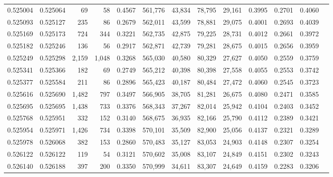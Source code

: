 \begin{tabular}{rrrrrrrrrrrrr}
0.525004 & 0.525064 &    69 &    58 &                                     0.4567 & 561,776 &  43,834 &  78,795 &  29,161 & 0.3995 & 0.2701 & 0.4060 \\
0.525093 & 0.525127 &   235 &    86 &                                     0.2679 & 562,011 &  43,599 &  78,881 &  29,075 & 0.4001 & 0.2693 & 0.4039 \\
0.525169 & 0.525173 &   724 &   344 &                                     0.3221 & 562,735 &  42,875 &  79,225 &  28,731 & 0.4012 & 0.2661 & 0.3972 \\
0.525182 & 0.525246 &   136 &    56 &                                     0.2917 & 562,871 &  42,739 &  79,281 &  28,675 & 0.4015 & 0.2656 & 0.3959 \\
0.525249 & 0.525298 & 2,159 & 1,048 &                                     0.3268 & 565,030 &  40,580 &  80,329 &  27,627 & 0.4050 & 0.2559 & 0.3759 \\
0.525341 & 0.525366 &   182 &    69 &                                     0.2749 & 565,212 &  40,398 &  80,398 &  27,558 & 0.4055 & 0.2553 & 0.3742 \\
0.525377 & 0.525584 &   211 &    86 &                                     0.2896 & 565,423 &  40,187 &  80,484 &  27,472 & 0.4060 & 0.2545 & 0.3723 \\
0.525616 & 0.525690 & 1,482 &   797 &                                     0.3497 & 566,905 &  38,705 &  81,281 &  26,675 & 0.4080 & 0.2471 & 0.3585 \\
0.525695 & 0.525695 & 1,438 &   733 &                                     0.3376 & 568,343 &  37,267 &  82,014 &  25,942 & 0.4104 & 0.2403 & 0.3452 \\
0.525768 & 0.525951 &   332 &   152 &                                     0.3140 & 568,675 &  36,935 &  82,166 &  25,790 & 0.4112 & 0.2389 & 0.3421 \\
0.525954 & 0.525971 & 1,426 &   734 &                                     0.3398 & 570,101 &  35,509 &  82,900 &  25,056 & 0.4137 & 0.2321 & 0.3289 \\
0.525978 & 0.526068 &   382 &   153 &                                     0.2860 & 570,483 &  35,127 &  83,053 &  24,903 & 0.4148 & 0.2307 & 0.3254 \\
0.526122 & 0.526122 &   119 &    54 &                                     0.3121 & 570,602 &  35,008 &  83,107 &  24,849 & 0.4151 & 0.2302 & 0.3243 \\
0.526140 & 0.526188 &   397 &   200 &                                     0.3350 & 570,999 &  34,611 &  83,307 &  24,649 & 0.4159 & 0.2283 & 0.3206 \\

\end{tabular}
